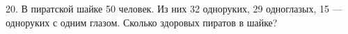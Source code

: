 20. В пиратской шайке 50 человек. Из них 32 одноруких, 29 одноглазых, 15 --- одноруких с одним глазом. Сколько здоровых пиратов в шайке?\\
